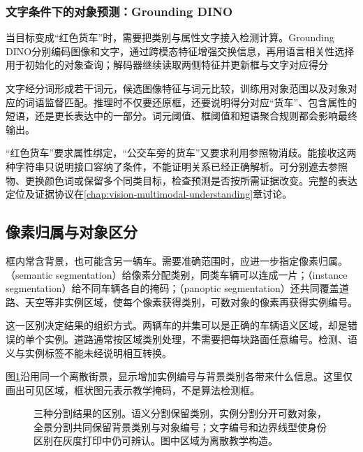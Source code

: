 \Needspace{65mm}
\subsubsection{文字条件下的对象预测：Grounding DINO}
\label{sec:vision-recognition-grounding-dino}

当目标变成“红色货车”时，需要把类别与属性文字接入检测计算。Grounding DINO分别编码图像和文字，通过跨模态特征增强交换信息，再用语言相关性选择用于初始化的对象查询；解码器继续读取两侧特征并更新框与文字对应得分

文字经分词形成若干词元，候选图像特征与词元比较，训练用对象范围以及对象对应的词语监督匹配。推理时不仅要还原框，还要说明得分对应“货车”、包含属性的短语，还是更长表达中的一部分。词元阈值、框阈值和短语聚合规则都会影响最终输出。

“红色货车”要求属性绑定，“公交车旁的货车”又要求利用参照物消歧。能接收这两种字符串只说明接口容纳了条件，不能证明关系已经正确解析。可分别遮去参照物、更换颜色词或保留多个同类目标，检查预测是否按所需证据改变。完整的表达定位及证据协议在\ref{chap:vision-multimodal-understanding}章讨论。

\subsection{像素归属与对象区分}
\label{sec:vision-recognition-segmentation}

框内常含背景，也可能含另一辆车。需要准确范围时，应进一步指定像素归属。（semantic segmentation）给像素分配类别，同类车辆可以连成一片；（instance segmentation）给不同车辆各自的掩码；（panoptic segmentation）还共同覆盖道路、天空等非实例区域，使每个像素获得类别，可数对象的像素再获得实例编号。

这一区别决定结果的组织方式。两辆车的并集可以是正确的车辆语义区域，却是错误的单个实例。道路通常按区域类别处理，不需要把每块路面任意编号。检测、语义与实例标签不能未经说明相互转换。

图\ref{fig:vision-segmentation-outputs}沿用同一个离散街景，显示增加实例编号与背景类别各带来什么信息。这里仅画出可见区域，框状图元表示教学掩码，不是算法检测框。

\begin{figure}[htbp]
 \centering
 
 \caption{三种分割结果的区别。语义分割保留类别，实例分割分开可数对象，全景分割共同保留背景类别与对象编号；文字编号和边界线型使身份区别在灰度打印中仍可辨认。图中区域为离散教学构造。}
 \label{fig:vision-segmentation-outputs}
\end{figure}

